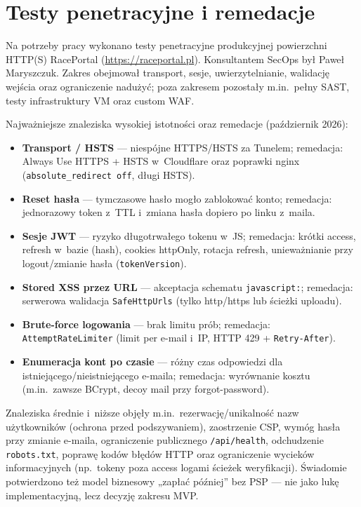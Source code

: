 \documentclass{sprz}
\begin{document}
\section{Testy penetracyjne i remedacje}
\label{sec:pentest}
Na potrzeby pracy wykonano testy penetracyjne produkcyjnej powierzchni HTTP(S) RacePortal (\url{https://raceportal.pl}). Konsultantem SecOps był Paweł Maryszczuk. Zakres obejmował transport, sesje, uwierzytelnianie, walidację wejścia oraz ograniczenie nadużyć; poza zakresem pozostały m.in.\ pełny SAST, testy infrastruktury VM oraz custom WAF.

Najważniejsze znaleziska wysokiej istotności oraz remedacje (październik 2026):
\begin{itemize}
  \item \textbf{Transport / HSTS} --- niespójne HTTPS/HSTS za Tunelem; remedacja: Always Use HTTPS + HSTS w~Cloudflare oraz poprawki nginx (\texttt{absolute\_redirect off}, długi HSTS).
  \item \textbf{Reset hasła} --- tymczasowe hasło mogło zablokować konto; remedacja: jednorazowy token z~TTL i~zmiana hasła dopiero po linku z~maila.
  \item \textbf{Sesje JWT} --- ryzyko długotrwałego tokenu w~JS; remedacja: krótki access, refresh w~bazie (hash), cookies httpOnly, rotacja refresh, unieważnianie przy logout/zmianie hasła (\texttt{tokenVersion}).
  \item \textbf{Stored XSS przez URL} --- akceptacja schematu \texttt{javascript:}; remedacja: serwerowa walidacja \texttt{SafeHttpUrls} (tylko http/https lub ścieżki uploadu).
  \item \textbf{Brute-force logowania} --- brak limitu prób; remedacja: \texttt{AttemptRateLimiter} (limit per e-mail i~IP, HTTP 429 + \texttt{Retry-After}).
  \item \textbf{Enumeracja kont po czasie} --- różny czas odpowiedzi dla istniejącego/nieistniejącego e-maila; remedacja: wyrównanie kosztu (m.in.\ zawsze BCrypt, decoy mail przy forgot-password).
\end{itemize}

Znaleziska średnie i~niższe objęły m.in.\ rezerwację/unikalność nazw użytkowników (ochrona przed podszywaniem), zaostrzenie CSP, wymóg hasła przy zmianie e-maila, ograniczenie publicznego \texttt{/api/health}, odchudzenie \texttt{robots.txt}, poprawę kodów błędów HTTP oraz ograniczenie wycieków informacyjnych (np.\ tokeny poza access logami ścieżek weryfikacji). Świadomie potwierdzono też model biznesowy „zapłać później” bez PSP --- nie jako lukę implementacyjną, lecz decyzję zakresu MVP.
\end{document}
